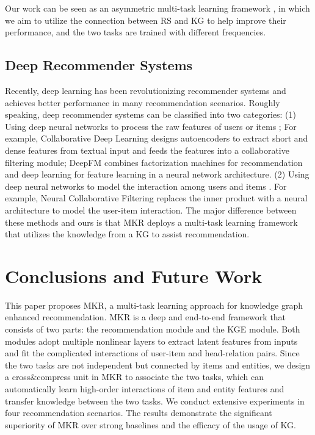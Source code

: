 \documentclass[sigconf]{acmart}
\begin{document}
		Our work can be seen as an asymmetric multi-task learning framework \cite{xue2007multi, zhang2012convex, zhang2014regularization}, in which we aim to utilize the connection between RS and KG to help improve their performance, and  the two tasks are trained with different frequencies.
		
		
	\subsection{Deep Recommender Systems}
		Recently, deep learning has been revolutionizing recommender systems and achieves better performance in many recommendation scenarios.
		Roughly speaking, deep recommender systems can be classified into two categories:
		(1) Using deep neural networks to process the raw features of users or items \cite{wang2015collaborative, wang2018shine, zhang2016collaborative, wang2017joint, guo2017deepfm};
		For example, Collaborative Deep Learning \cite{wang2015collaborative} designs autoencoders to extract short and dense features from textual input and feeds the features into a collaborative filtering module;
		DeepFM \cite{guo2017deepfm} combines factorization machines for recommendation and deep learning for feature learning in a neural network architecture.
		(2) Using deep neural networks to model the interaction among users and items \cite{huang2013learning, cheng2016wide, covington2016deep, he2017neural}.
		For example, Neural Collaborative Filtering \cite{he2017neural} replaces the inner product with a neural architecture to model the user-item interaction.
		The major difference between these methods and ours is that MKR deploys a multi-task learning framework that utilizes the knowledge from a KG to assist recommendation.




\section{Conclusions and Future Work}
	This paper proposes MKR, a multi-task learning approach for knowledge graph enhanced recommendation.
	MKR is a deep and end-to-end framework that consists of two parts: the recommendation module and the KGE module.
	Both modules adopt multiple nonlinear layers to extract latent features from inputs and fit the complicated interactions of user-item and head-relation pairs. 
	Since the two tasks are not independent but connected by items and entities, we design a cross$\&$compress unit in MKR to associate the two tasks, which can automatically learn high-order interactions of item and entity features and transfer knowledge between the two tasks.
	We conduct extensive experiments in four recommendation scenarios.
	The results demonstrate the significant superiority of MKR over strong baselines and the efficacy of the usage of KG.
	
\end{document}

